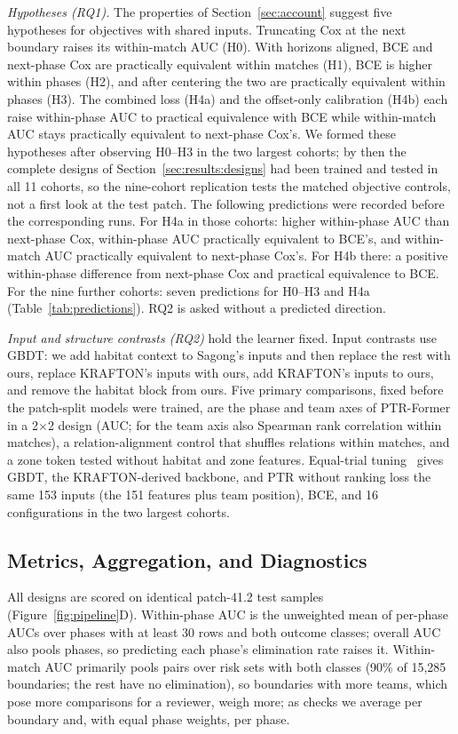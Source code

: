 \documentclass[sigconf,anonymous]{acmart}
\begin{document}
\emph{Hypotheses (RQ1).} The properties of Section~\ref{sec:account} suggest five hypotheses for objectives with shared inputs. Truncating Cox at the next boundary raises its within-match AUC (H0). With horizons aligned, BCE and next-phase Cox are practically equivalent within matches (H1), BCE is higher within phases (H2), and after centering the two are practically equivalent within phases (H3). The combined loss (H4a) and the offset-only calibration (H4b) each raise within-phase AUC to practical equivalence with BCE while within-match AUC stays practically equivalent to next-phase Cox's. We formed these hypotheses after observing H0--H3 in the two largest cohorts; by then the complete designs of Section~\ref{sec:results:designs} had been trained and tested in all 11 cohorts, so the nine-cohort replication tests the matched objective controls, not a first look at the test patch. The following predictions were recorded before the corresponding runs. For H4a in those cohorts: higher within-phase AUC than next-phase Cox, within-phase AUC practically equivalent to BCE's, and within-match AUC practically equivalent to next-phase Cox's. For H4b there: a positive within-phase difference from next-phase Cox and practical equivalence to BCE. For the nine further cohorts: seven predictions for H0--H3 and H4a (Table~\ref{tab:predictions}). RQ2 is asked without a predicted direction.

\emph{Input and structure contrasts (RQ2)} hold the learner fixed. Input contrasts use GBDT: we add habitat context to Sagong's inputs and then replace the rest with ours, replace KRAFTON's inputs with ours, add KRAFTON's inputs to ours, and remove the habitat block from ours. Five primary comparisons, fixed before the patch-split models were trained, are the phase and team axes of PTR-Former in a 2$\times$2 design (AUC; for the team axis also Spearman rank correlation within matches), a relation-alignment control that shuffles relations within matches, and a zone token tested without habitat and zone features. Equal-trial tuning~\cite{Bergstra12,Cawley10} gives GBDT, the KRAFTON-derived backbone, and PTR without ranking loss the same 153 inputs (the 151 features plus team position), BCE, and 16 configurations in the two largest cohorts.

\subsection{Metrics, Aggregation, and Diagnostics}
\label{sec:method:units}
All designs are scored on identical patch-41.2 test samples (Figure~\ref{fig:pipeline}D). Within-phase AUC is the unweighted mean of per-phase AUCs over phases with at least 30 rows and both outcome classes; overall AUC also pools phases, so predicting each phase's elimination rate raises it. Within-match AUC primarily pools pairs over risk sets with both classes (90\% of 15,285 boundaries; the rest have no elimination), so boundaries with more teams, which pose more comparisons for a reviewer, weigh more; as checks we average per boundary and, with equal phase weights, per phase.
\end{document}
